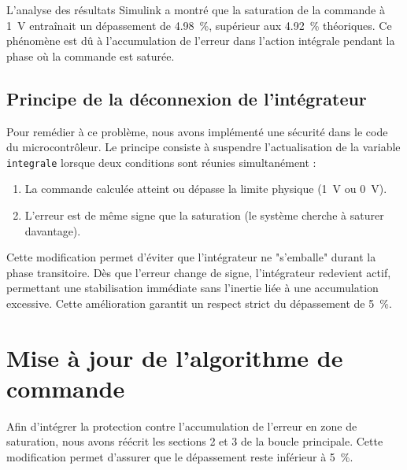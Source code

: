 \documentclass[11pt]{report}
\begin{document}
L'analyse des résultats Simulink a montré que la saturation de la commande à \qty{1}{V} entraînait un dépassement de \qty{4.98}{\%}, supérieur aux \qty{4,92}{\%} théoriques. Ce phénomène est dû à l'accumulation de l'erreur dans l'action intégrale pendant la phase où la commande est saturée.

\subsection{Principe de la déconnexion de l'intégrateur}
Pour remédier à ce problème, nous avons implémenté une sécurité dans le code du microcontrôleur. Le principe consiste à suspendre l'actualisation de la variable \texttt{integrale} lorsque deux conditions sont réunies simultanément :
\begin{enumerate}
    \item La commande calculée atteint ou dépasse la limite physique (\qty{1}{V} ou \qty{0}{V}).
    \item L'erreur est de même signe que la saturation (le système cherche à saturer davantage).
\end{enumerate}

Cette modification permet d'éviter que l'intégrateur ne "s'emballe" durant la phase transitoire. Dès que l'erreur change de signe, l'intégrateur redevient actif, permettant une stabilisation immédiate sans l'inertie liée à une accumulation excessive. Cette amélioration garantit un respect strict du dépassement de \qty{5}{\%}.

\section{Mise à jour de l'algorithme de commande}
Afin d'intégrer la protection contre l'accumulation de l'erreur en zone de saturation, nous avons réécrit les sections 2 et 3 de la boucle principale. Cette modification permet d'assurer que le dépassement reste inférieur à \qty{5}{\%}.
\end{document}
